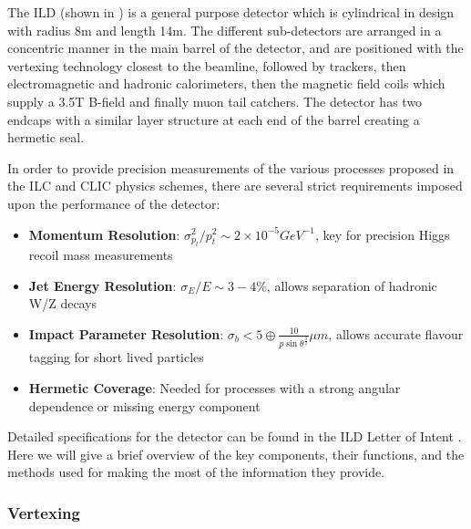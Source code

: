 The ILD (shown in ) is a general purpose detector which is cylindrical in design with radius 8m and length 14m. The different sub-detectors are arranged in a concentric manner in the main barrel of the detector, and are positioned with the vertexing technology closest to the beamline, followed by trackers, then electromagnetic and hadronic calorimeters, then the magnetic field coils which supply a 3.5T B-field and finally muon tail catchers. The detector has two endcaps with a similar layer structure at each end of the barrel creating a hermetic seal.

In order to provide precision measurements of the various processes proposed in the \ac{ILC} and \ac{CLIC} physics schemes, there are several strict requirements imposed upon the performance of the detector:

\begin{itemize}

\item \textbf{Momentum Resolution}: $\sigma_{p_t}^2/ p_{t}^2 \sim 2 \times 10^{-5} GeV^{-1}$, key for precision Higgs recoil mass measurements

\item \textbf{Jet Energy Resolution}: $\sigma_E/E \sim 3-4\%$, allows separation of hadronic W/Z decays

\item \textbf{Impact Parameter Resolution}: $\sigma_{b} < 5 \oplus \frac{10}{p\sin\theta^{\frac{3}{2}}}\mu m$, allows accurate flavour tagging for short lived particles

\item \textbf{Hermetic Coverage}: Needed for processes with a strong angular dependence or missing energy component 

\end{itemize}

Detailed specifications for the detector can be found in the \ac{ILD} Letter of Intent \cite{ILD}. Here we will give a brief overview of the key components, their functions, and the methods used for making the most of the information they provide.

\subsubsection{Vertexing}

